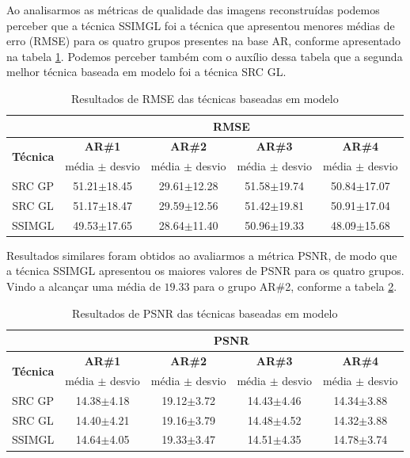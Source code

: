 Ao analisarmos as métricas de qualidade das imagens reconstruídas podemos perceber que a técnica SSIMGL foi a técnica que apresentou menores médias de erro (RMSE) para os quatro grupos presentes na base AR, conforme apresentado na tabela \ref{tab:RMSE_modelo}. Podemos perceber também com o auxílio dessa tabela que a segunda melhor técnica baseada em modelo foi a técnica SRC GL.

\begin{table}[H]
\caption{Resultados de RMSE das técnicas baseadas em modelo}
\centering
\begin{tabular}{|c|c|c|c|c|}
\cline{2-5}
 \multicolumn{1}{c|}{} & \multicolumn{4}{c|}{\textbf{RMSE}}\\ \hline
\multicolumn{1}{|c|}{\multirow{2}{*}{\textbf{Técnica} }}& \textbf{AR\#1} &  \textbf{AR\#2} & \textbf{AR\#3} & \textbf{AR\#4 }  \\ \cline{2-5}
& média $\pm$ desvio & média $\pm$ desvio & média $\pm$ desvio & média $\pm$ desvio \\\hline 
SRC GP&	51.21$\pm$18.45&	29.61$\pm$12.28&	51.58$\pm$19.74& 	50.84$\pm$17.07 \\\hline
SRC GL&	51.17$\pm$18.47&	29.59$\pm$12.56&	51.42$\pm$19.81&	50.91$\pm$17.04 \\\hline
SSIMGL&	49.53$\pm$17.65&	28.64$\pm$11.40&	50.96$\pm$19.33&	48.09$\pm$15.68 \\\hline
\end{tabular}
\label{tab:RMSE_modelo}
\end{table}


Resultados similares foram obtidos ao avaliarmos a métrica PSNR, de modo que a técnica SSIMGL apresentou os maiores valores de PSNR para os quatro grupos. Vindo a alcançar uma média de $19.33$ para o grupo AR\#2, conforme a tabela \ref{tab:PSNR_modelo}.

\begin{table}[H]
\caption{Resultados de PSNR das técnicas baseadas em modelo}
\centering
\begin{tabular}{|c|c|c|c|c|}
\cline{2-5}
 \multicolumn{1}{c|}{} & \multicolumn{4}{c|}{\textbf{PSNR}}\\ \hline
\multicolumn{1}{|c|}{\multirow{2}{*}{\textbf{Técnica} }}& \textbf{AR\#1} &  \textbf{AR\#2} & \textbf{AR\#3} & \textbf{AR\#4 }  \\ \cline{2-5}
& média $\pm$ desvio & média $\pm$ desvio & média $\pm$ desvio & média $\pm$ desvio \\\hline 
SRC GP	&14.38$\pm$4.18&	19.12$\pm$3.72&	14.43$\pm$4.46&	14.34$\pm$3.88\\\hline
SRC GL	&14.40$\pm$4.21&	19.16$\pm$3.79&	14.48$\pm$4.52&	14.32$\pm$3.88\\\hline
SSIMGL	&14.64$\pm$4.05&	19.33$\pm$3.47&	14.51$\pm$4.35&	14.78$\pm$3.74\\\hline
\end{tabular}
\label{tab:PSNR_modelo}
\end{table}

